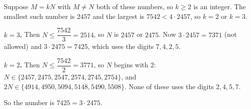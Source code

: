 Suppose $M=kN$ with $M\ne N$ both of these numbers, so $k\ge2$ is an integer. The smallest such number is $2457$ and the largest is $7542<4\cdot2457$, so $k=2$ or $k=3$.

\textbf{$k=3$.} Then $N\le\dfrac{7542}{3}=2514$, so $N$ is $2457$ or $2475$. Now $3\cdot2457=7371$ (not allowed) and $3\cdot2475=7425$, which uses the digits $7,4,2,5$.

\textbf{$k=2$.} Then $N\le\dfrac{7542}{2}=3771$, so $N$ begins with $2$: $N\in\{2457,2475,2547,2574,2745,2754\}$, and $2N\in\{4914,4950,5094,5148,5490,5508\}$. None of these uses the digits $2,4,5,7$.

So the number is $\boxed{7425}=3\cdot2475$.
